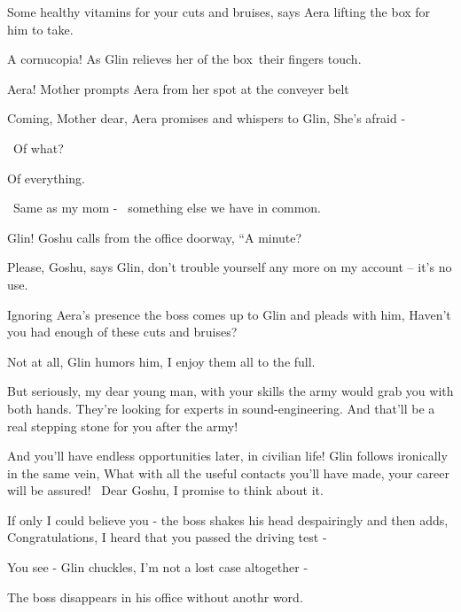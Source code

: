 \documentclass[12pt]{book}
\begin{document}
{\textquotedbl}Some healthy vitamins for your cuts and bruises,{\textquotedbl} says Aera lifting the box for him to
take.

{\textquotedbl}A cornucopia!{\textquotedbl} As Glin relieves her of the box~their fingers touch.

{\textquotedbl}Aera!{\textquotedbl} Mother prompts Aera from her spot at the conveyer belt

{\textquotedbl}Coming, Mother dear,{\textquotedbl} Aera promises and whispers to Glin, {\textquotedbl}She's afraid
-{\textquotedbl}

~{\textquotedbl}Of what?{\textquotedbl}

{\textquotedbl}Of everything.{\textquotedbl}

~{\textquotedbl}Same as my mom - \ something else we have in common.{\textquotedbl}

{\textquotedbl}Glin!{\textquotedbl} Goshu calls from the office doorway, ``A minute?{\textquotedbl}

{\textquotedbl}Please, Goshu,{\textquotedbl} says Glin, {\textquotedbl}don't trouble yourself any more on my account --
it's no use.{\textquotedbl}

Ignoring Aera's presence the boss comes up to Glin and pleads with him, {\textquotedbl}Haven't you had enough of these
cuts and bruises?{\textquotedbl}

{\textquotedbl}Not at all,{\textquotedbl} Glin humors him, {\textquotedbl}I enjoy them all to the full.{\textquotedbl}

{\textquotedbl}But seriously, my dear young man, with your skills the army would grab you with both hands. They're
looking for experts in sound-engineering. And that'll be a real stepping stone for you after the army!{\textquotedbl}

{\textquotedbl}And you'll have endless opportunities later, in civilian life!{\textquotedbl} Glin follows
ironically{ }in the same vein, {\textquotedbl}What with all the useful contacts you'll have made, your
career will be assured! ~Dear Goshu, I promise to think about it.{\textquotedbl}

{{\textquotedbl}If only I could believe you -{\textquotedbl} the boss shakes his head despairingly and
then adds, {\textquotedbl}Congratulations, I heard that you passed the driving test - {\textquotedbl}}

{{\textquotedbl}You see -{\textquotedbl} Glin chuckles, {\textquotedbl}I'm not a lost case altogether
-{\textquotedbl}}

{The boss disappears in his office without anothr word. }
\end{document}
